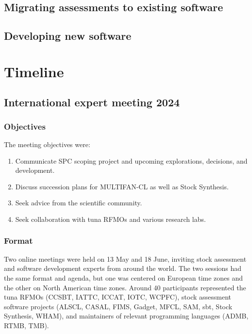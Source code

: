 \documentclass{SCreport}
\begin{document}
\subsection{Migrating assessments to existing software}

\subsection{Developing new software}

\section{Timeline}

\subsection{International expert meeting 2024}

\subsubsection{Objectives}

The meeting objectives were:

\begin{enumerate}
  \item Communicate SPC scoping project and upcoming explorations, decisions,
  and development.
  \item Discuss succession plans for MULTIFAN-CL as well as Stock Synthesis.
  \item Seek advice from the scientific community.
  \item Seek collaboration with tuna RFMOs and various research labs.
\end{enumerate}

\subsubsection{Format}

Two online meetings were held on 13 May and 18 June, inviting stock assessment
and software development experts from around the world. The two sessions had the
same format and agenda, but one was centered on European time zones and the
other on North American time zones. Around 40 participants represented the tuna
RFMOs (CCSBT, IATTC, ICCAT, IOTC, WCPFC), stock assessment software projects
(ALSCL, CASAL, FIMS, Gadget, MFCL, SAM, sbt, Stock Synthesis, WHAM), and
maintainers of relevant programming languages (ADMB, RTMB, TMB).
\end{document}
